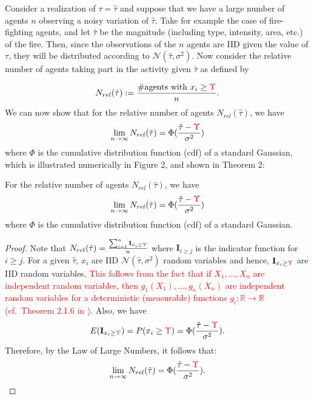 \documentclass[smallextended]{svjour3}       %
\newcommand{\edit}[1]{\textcolor{red}{#1}}
\def\R{\mathbb{R}}    %
\def\td{\edit{\Upsilon}}   %
\begin{document}
Consider a realization of $\tau=\hat{\tau}$ and suppose that we have a large number of agents $n$ observing a noisy variation of $\hat{\tau}$. Take for example the case of fire-fighting agents, and let $\hat{\tau}$ be the magnitude (including type, intensity, area, etc.) of the fire. Then, since the observations of the $n$ agents are IID given the value of $\tau$, they will be distributed according to $\mathcal{N}(\hat{\tau},\sigma^2)$. Now consider the relative number of agents taking part in the activity given $\hat{\tau}$ as defined by

\begin{equation*}
	N_{rel}(\hat{\tau}):=\frac{\#\text{agents with }x_i\geq \td}{n}.
\end{equation*}
We can now show that for the relative number of agents $N_{rel}(\hat{\tau})$, we have
\begin{equation}
\lim_{n\to\infty}N_{rel}(\hat{\tau})=\Phi(\frac{\hat{\tau}-\td}{\sigma^2})
\end{equation}
where $\Phi$ is the cumulative distribution function (cdf) of a standard Gaussian, which is illustrated numerically in Figure 2, and shown in Theorem 2:  

\begin{theorem}\label{thrm:relativefrequency}
For the relative number of agents $N_{rel}(\hat{\tau})$, we have
\begin{equation}
\lim_{n\to\infty}N_{rel}(\hat{\tau})=\Phi(\frac{\hat{\tau}-\td}{\sigma^2})
\end{equation}
where $\Phi$ is the cumulative distribution function (cdf) of a standard Gaussian. 
\end{theorem}
\begin{proof}
Note that $N_{rel}(\hat{\tau})=\frac{\sum_{i=1}^n\mathbf{I}_{x_i\geq \td}}{n}$ where $\mathbf{I}_{i\geq j}$ is the indicator function for $i\geq j$. For a given $\hat{\tau}$, $x_i$ are IID $\mathcal{N}(\hat{\tau},\sigma^2)$ random variables and hence, $\mathbf{I}_{x_i\geq \td}$ are IID random variables. \edit{This follows from the fact that if $X_1,\ldots,X_n$ are independent random variables, then $g_1(X_1),\ldots,g_n(X_n)$ are independent random variables for a deterministic (measurable) functions $g_i:\R\to\R$ (cf.\ Theorem 2.1.6 in \cite{durrett2010probability}).} Also, we have 
\[E(\mathbf{I}_{x_i\geq \td})=P(x_i\geq \td)=\Phi(\frac{\hat{\tau}-\td}{\sigma^2}).\]
 Therefore, by the Law of Large Numbers, it follows that:
\begin{align*}
\lim_{n\to\infty}N_{rel}(\hat{\tau})=\Phi(\frac{\hat{\tau}-\td}{\sigma^2}).
\end{align*}
\end{proof}
\end{document}
